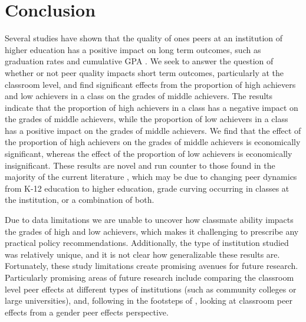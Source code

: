 \documentclass[12pt,letterpaper,english,fleqn]{article}
\begin{document}


\section{Conclusion}\label{conclusion}


Several studies have shown that the quality of ones peers at an institution of higher education has a positive impact on long term outcomes, such as graduation rates and cumulative GPA \citep{smith2015new,luppino2015college,ost2010role}.
We seek to answer the question of whether or not peer quality impacts short term outcomes, particularly at the classroom level, and find significant effects from the proportion of high achievers and low achievers in a class on the grades of middle achievers. 
The results indicate that the proportion of high achievers in a class has a negative impact on the grades of middle achievers, while the proportion of low achievers in a class has a positive impact on the grades of middle achievers. 
We find that the effect of the proportion of high achievers on the grades of middle achievers is economically significant, whereas the effect of the proportion of low achievers is economically insignificant. 
These results are novel and run counter to those found in the majority of the current literature \citep{kang2007classroom,carman2012classroom,burke2013classroom,schlosser2008inside,lavy2012good}, which may be due to changing peer dynamics from K-12 education to higher education, grade curving occurring in classes at the institution, or a combination of both.
 
Due to data limitations we are unable to uncover how classmate ability impacts the grades of high and low achievers, which makes it challenging to prescribe any practical policy recommendations.
Additionally, the type of institution studied was relatively unique, and it is not clear how generalizable these results are. 
Fortunately, these study limitations create promising avenues for future research.
Particularly promising areas of future research include comparing the classroom level peer effects at different types of institutions (such as community colleges or large universities), and, following in the footsteps of \citet{oosterbeek2014gender}, looking at classroom peer effects from a gender peer effects perspective.
       
\newpage{}

\pagestyle{plain}
\singlespacing
{}


\clearpage{}

\pagestyle{fancy}
\begin{appendices}



\end{appendices}
\end{document}
